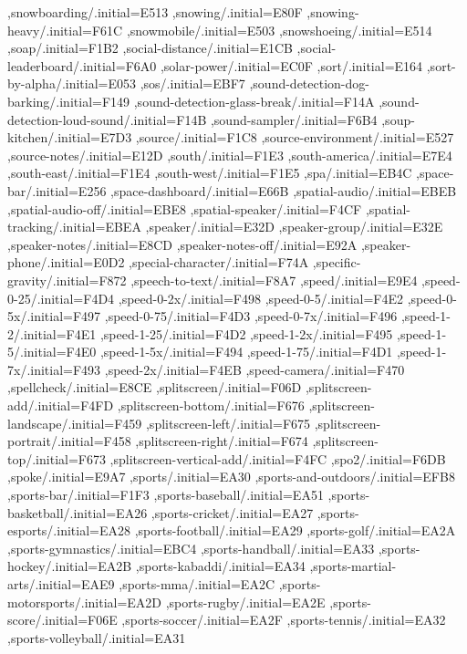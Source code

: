{ ,snowboarding/.initial=E513
 ,snowing/.initial=E80F
 ,snowing-heavy/.initial=F61C
 ,snowmobile/.initial=E503
 ,snowshoeing/.initial=E514
 ,soap/.initial=F1B2
 ,social-distance/.initial=E1CB
 ,social-leaderboard/.initial=F6A0
 ,solar-power/.initial=EC0F
 ,sort/.initial=E164
 ,sort-by-alpha/.initial=E053
 ,sos/.initial=EBF7
 ,sound-detection-dog-barking/.initial=F149
 ,sound-detection-glass-break/.initial=F14A
 ,sound-detection-loud-sound/.initial=F14B
 ,sound-sampler/.initial=F6B4
 ,soup-kitchen/.initial=E7D3
 ,source/.initial=F1C8
 ,source-environment/.initial=E527
 ,source-notes/.initial=E12D
 ,south/.initial=F1E3
 ,south-america/.initial=E7E4
 ,south-east/.initial=F1E4
 ,south-west/.initial=F1E5
 ,spa/.initial=EB4C
 ,space-bar/.initial=E256
 ,space-dashboard/.initial=E66B
 ,spatial-audio/.initial=EBEB
 ,spatial-audio-off/.initial=EBE8
 ,spatial-speaker/.initial=F4CF
 ,spatial-tracking/.initial=EBEA
 ,speaker/.initial=E32D
 ,speaker-group/.initial=E32E
 ,speaker-notes/.initial=E8CD
 ,speaker-notes-off/.initial=E92A
 ,speaker-phone/.initial=E0D2
 ,special-character/.initial=F74A
 ,specific-gravity/.initial=F872
 ,speech-to-text/.initial=F8A7
 ,speed/.initial=E9E4
 ,speed-0-25/.initial=F4D4
 ,speed-0-2x/.initial=F498
 ,speed-0-5/.initial=F4E2
 ,speed-0-5x/.initial=F497
 ,speed-0-75/.initial=F4D3
 ,speed-0-7x/.initial=F496
 ,speed-1-2/.initial=F4E1
 ,speed-1-25/.initial=F4D2
 ,speed-1-2x/.initial=F495
 ,speed-1-5/.initial=F4E0
 ,speed-1-5x/.initial=F494
 ,speed-1-75/.initial=F4D1
 ,speed-1-7x/.initial=F493
 ,speed-2x/.initial=F4EB
 ,speed-camera/.initial=F470
 ,spellcheck/.initial=E8CE
 ,splitscreen/.initial=F06D
 ,splitscreen-add/.initial=F4FD
 ,splitscreen-bottom/.initial=F676
 ,splitscreen-landscape/.initial=F459
 ,splitscreen-left/.initial=F675
 ,splitscreen-portrait/.initial=F458
 ,splitscreen-right/.initial=F674
 ,splitscreen-top/.initial=F673
 ,splitscreen-vertical-add/.initial=F4FC
 ,spo2/.initial=F6DB
 ,spoke/.initial=E9A7
 ,sports/.initial=EA30
 ,sports-and-outdoors/.initial=EFB8
 ,sports-bar/.initial=F1F3
 ,sports-baseball/.initial=EA51
 ,sports-basketball/.initial=EA26
 ,sports-cricket/.initial=EA27
 ,sports-esports/.initial=EA28
 ,sports-football/.initial=EA29
 ,sports-golf/.initial=EA2A
 ,sports-gymnastics/.initial=EBC4
 ,sports-handball/.initial=EA33
 ,sports-hockey/.initial=EA2B
 ,sports-kabaddi/.initial=EA34
 ,sports-martial-arts/.initial=EAE9
 ,sports-mma/.initial=EA2C
 ,sports-motorsports/.initial=EA2D
 ,sports-rugby/.initial=EA2E
 ,sports-score/.initial=F06E
 ,sports-soccer/.initial=EA2F
 ,sports-tennis/.initial=EA32
 ,sports-volleyball/.initial=EA31
}
